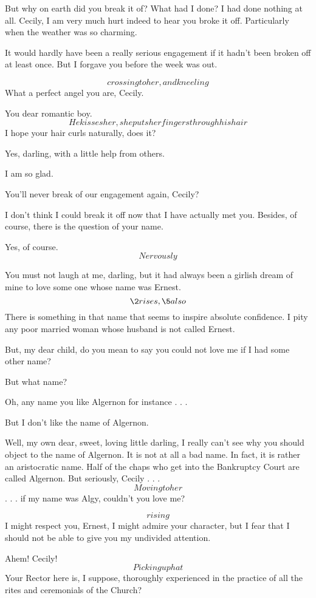 \documentclass{book}
\begin{document}
\2  But why on earth did you break it of?  What had I done?
I had done nothing at all.  Cecily, I am very much hurt indeed to
hear you broke it off.  Particularly when the weather was so
charming.

\5  It would hardly have been a really serious engagement if
it hadn't been broken off at least once.  But I forgave you before
the week was out.

\2  \[crossing to her, and kneeling\]  What a perfect angel
you are, Cecily.

\5  You dear romantic boy.  \[He kisses her, she puts her
fingers through his hair\]  I hope your hair curls naturally, does
it?

\2  Yes, darling, with a little help from others.

\5  I am so glad.

\2  You'll never break of our engagement again, Cecily?

\5  I don't think I could break it off now that I have
actually met you.  Besides, of course, there is the question of
your name.

\2  Yes, of course.  \[Nervously\]

\5  You must not laugh at me, darling, but it had always been
a girlish dream of mine to love some one whose name was Ernest.
\[\2 rises, \5 also\]  There is something in that name
that seems to inspire absolute confidence.  I pity any poor married
woman whose husband is not called Ernest.

\2  But, my dear child, do you mean to say you could not
love me if I had some other name?

\5  But what name?

\2  Oh, any name you like \textemdash Algernon \textemdash for instance . . .

\5  But I don't like the name of Algernon.

\2  Well, my own dear, sweet, loving little darling, I
really can't see why you should object to the name of Algernon.  It
is not at all a bad name.  In fact, it is rather an aristocratic
name.  Half of the chaps who get into the Bankruptcy Court are
called Algernon.  But seriously, Cecily . . . \[Moving to her\] . . .
if my name was Algy, couldn't you love me?

\5  \[rising\]  I might respect you, Ernest, I might admire
your character, but I fear that I should not be able to give you my
undivided attention.

\2  Ahem!  Cecily!  \[Picking up hat\]  Your Rector here is,
I suppose, thoroughly experienced in the practice of all the rites
and ceremonials of the Church?
\end{document}
